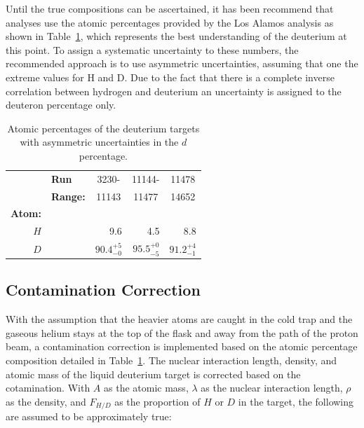 Until the true compositions can be ascertained, it has been recommend that analyses use the atomic percentages provided by the Los Alamos analysis as shown in Table~\ref{tab:deut-atomic-perc}, which represents the best understanding of the deuterium at this point. To assign a systematic uncertainty to these numbers, the recommended approach is to use asymmetric uncertainties, assuming that one the extreme values for H and D. Due to the fact that there is a complete inverse correlation between hydrogen and deuterium an uncertainty is assigned to the deuteron percentage only.

\begin{table}
	\centering
	\begin{tabular}{@{}rlrrr@{}}
		\toprule
		{} & \textbf{Run} & \multicolumn{1}{c}{3230-} & \multicolumn{1}{c}{11144-} &  \multicolumn{1}{c}{11478} \\ 
		{} & \textbf{Range:} & \multicolumn{1}{c}{11143} & \multicolumn{1}{c}{11477} &  \multicolumn{1}{c}{14652} \\ 
		\textbf{Atom:} & & & & \\ \midrule
		$H$	& & 9.6   & 4.5  & 8.8 \\
		$D$    & & $90.4^{+5}_{-0}$ & $95.5^{+0}_{-5}$  & $91.2^{+4}_{-1}$ \\
		\bottomrule
	\end{tabular}
	\caption{Atomic percentages of the deuterium targets with asymmetric uncertainties in the $d$ percentage.}
	\label{tab:deut-atomic-perc}
\end{table}

\subsection{Contamination Correction}

With the assumption that the heavier atoms are caught in the cold trap and the gaseous helium stays at the top of the flask and away from the path of the proton beam, a contamination correction is implemented based on the atomic percentage composition detailed in Table~\ref{tab:deut-atomic-perc}. The nuclear interaction length, density, and atomic mass of the liquid deuterium target is corrected based on the cotamination. With $A$ as the atomic mass, $\lambda$ as the nuclear interaction length, $\rho$ as the density, and $F_{H/D}$ as the proportion of $H$ or $D$ in the target, the following are assumed to be approximately true:

